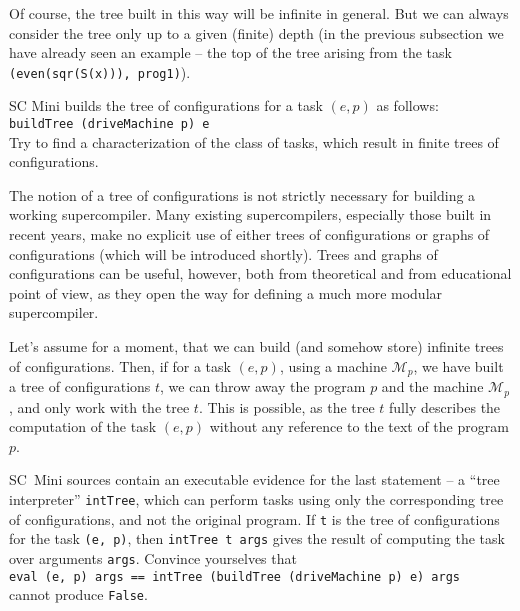 Of course, the tree built in this way will be infinite in general.
But we can always consider the tree only up to a given (finite) depth
(in the previous subsection we have already seen an example -- the top of the
tree arising from the task \texttt{(even(sqr(S(x))), prog1)}).



\begin{exercise}
SC Mini builds the tree of configurations for a task $(e, p)$ as follows:
\\ \texttt{buildTree (driveMachine p) e}
\\
Try to find a characterization of the class of tasks, which result in finite trees of configurations.
\end{exercise}

The notion of a tree of configurations is not strictly necessary for building a working 
supercompiler.
Many existing supercompilers, especially those built in recent years,
make no explicit use of either trees of configurations or graphs of configurations 
(which will be introduced shortly).
Trees and graphs of configurations can be useful, however, 
both from theoretical and from educational point of view,
as they open the way for defining a much more modular supercompiler.

Let's assume for a moment, that we can build (and somehow store) infinite trees of configurations.
Then, if for a task $(e, p)$, using a machine $\mathcal{M}_p$, we have built a tree of configurations $t$,
we can throw away the program $p$ and the machine $\mathcal{M}_p$, and only work with the tree $t$.
This is possible, as the tree $t$ fully describes the computation of the task $(e, p)$
without any reference to the text of the program $p$.

\begin{exercise}
SC~Mini sources contain an executable evidence for the last statement --
a ``tree interpreter'' \texttt{intTree}, which can perform tasks using only the 
corresponding tree of configurations, and not the original program.
If \texttt{t} is the tree of configurations for the task \texttt{(e, p)}, 
then \texttt{intTree t args} gives the result of computing the task over arguments \texttt{args}. 
Convince yourselves that
\\  \texttt{eval (e, p) args == intTree (buildTree (driveMachine p) e) args}
\\  cannot produce \texttt{False}.
\end{exercise}


